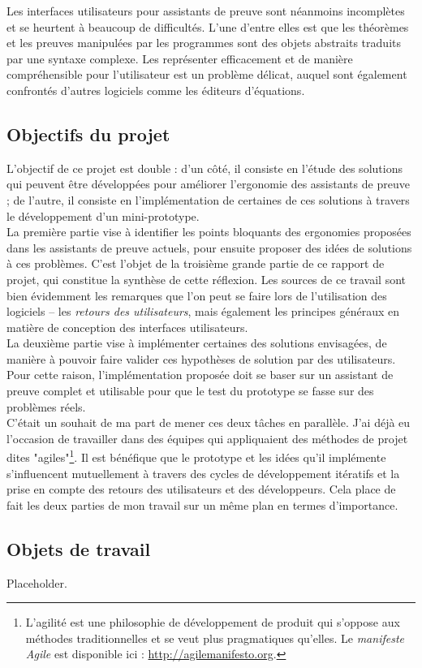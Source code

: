Les interfaces utilisateurs pour assistants de preuve sont néanmoins incomplètes et se heurtent à beaucoup de difficultés. L'une d'entre elles est que les théorèmes et les preuves manipulées par les programmes sont des objets abstraits traduits par une syntaxe complexe. Les représenter efficacement et de manière compréhensible pour l'utilisateur est un problème délicat, auquel sont également confrontés d'autres logiciels comme les éditeurs d'équations.

\subsection{Objectifs du projet}

L'objectif de ce projet est double : d'un côté, il consiste en l'étude des solutions qui peuvent être développées pour améliorer l'ergonomie des assistants de preuve ; de l'autre, il consiste en l'implémentation de certaines de ces solutions à travers le développement d'un mini-prototype.\\

La première partie vise à identifier les points bloquants des ergonomies proposées dans les assistants de preuve actuels, pour ensuite proposer des idées de solutions à ces problèmes. C'est l'objet de la troisième grande partie de ce rapport de projet, qui constitue la synthèse de cette réflexion. Les sources de ce travail sont bien évidemment les remarques que l'on peut se faire lors de l'utilisation des logiciels -- les \textit{retours des utilisateurs}, mais également les principes généraux en matière de conception des interfaces utilisateurs.\\

La deuxième partie vise à implémenter certaines des solutions envisagées, de manière à pouvoir faire valider ces hypothèses de solution par des utilisateurs. Pour cette raison, l'implémentation proposée doit se baser sur un assistant de preuve complet et utilisable pour que le test du prototype se fasse sur des problèmes réels.\\

C'était un souhait de ma part de mener ces deux tâches en parallèle. J'ai déjà eu l'occasion de travailler dans des équipes qui appliquaient des méthodes de projet dites "agiles"\footnote{L'agilité est une philosophie de développement de produit qui s'oppose aux méthodes traditionnelles et se veut plus pragmatiques qu'elles. Le \textit{manifeste Agile} est disponible ici : \url{http://agilemanifesto.org}.}. Il est bénéfique que le prototype et les idées qu'il implémente s'influencent mutuellement à travers des cycles de développement itératifs et la prise en compte des retours des utilisateurs et des développeurs. Cela place de fait les deux parties de mon travail sur un même plan en termes d'importance.

\subsection{Objets de travail}

Placeholder.